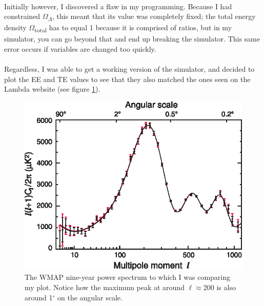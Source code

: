 \documentclass[twoside, fontsize=12pt,
     bibliography=totoc, %
     listof=totoc, %
     index=totoc, %
     onehalfspacing %
]{_MScDiss2017_cls}
\begin{document}
\paragraph{}

Initially however, I discovered a flaw in my programming. Because I had constrained $\Omega$\textsubscript{$\Lambda$}, this meant that its value was completely fixed; the total energy density $\Omega$\textsubscript{total} has to equal 1 because it is comprised of ratios, but in my simulator, you can go beyond that and end up breaking the simulator. This same error occurs if variables are changed too quickly.

\paragraph{}

Regardless, I was able to get a working version of the simulator, and decided to plot the EE and TE values to see that they also matched the ones seen on the Lambda website (see figure \ref{ogcmb}).

\label{sec:template}

\begin{figure}
	\begin{center}
	\includegraphics[width=\textwidth]{gh9-f02.eps}
	\caption{The WMAP nine-year power spectrum to which I was comparing my plot. Notice how the maximum peak at around $\ell$$\approx$200 is also around 1$^\circ$ on the angular scale. \cite{LambdaTools}}
	\label{ogcmb}
	\end{center}
\end{figure}
\end{document}
